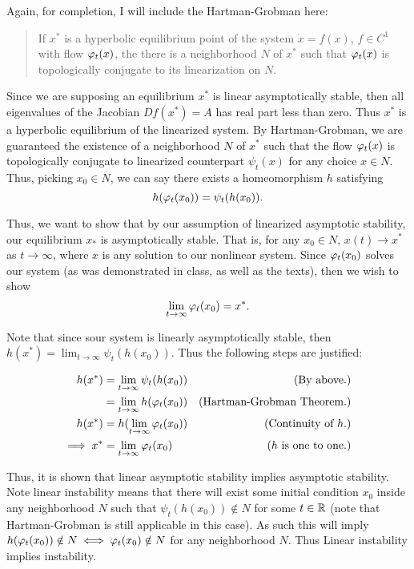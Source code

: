 \begin{solution}
    
    Again, for completion, I will include the Hartman-Grobman here:

    \alignbreak
    \vspace{-8mm}
    \begin{quote}
        If $x^*$ is a hyperbolic equilibrium point of the system $\dot{x} = f(x)$, $f \in C^1$ with flow $\varphi_t(x)$, the there is a neighborhood $N$ of $x^*$ such that $\varphi_t(x)$ is topologically conjugate to its linearization on $N$.
    \end{quote}
    \vspace{-8mm}
    \alignbreak

    Since we are supposing an equilibrium $x^*$ is linear asymptotically stable, then all eigenvalues of the Jacobian $Df(x^*) = A$ has real part less than zero. Thus $x^*$ is a hyperbolic equilibrium of the linearized system. By Hartman-Grobman, we are guaranteed the existence of a neighborhood $N$ of $x^*$ such that the flow $\varphi_t(x)$ is topologically conjugate to linearized counterpart $\psi_t(x)$ for any choice $x \in N$. Thus, picking $x_0 \in N$, we can say there exists a homeomorphism $h$ satisfying
    \[
    h(\varphi_t(x_0)) = \psi_t(h(x_0)).
    \]

    Thus, we want to show that by our assumption of linearized asymptotic stability, our equilibrium $x_*$ is asymptotically stable. That is, for any $x_0 \in N$, $x(t) \rightarrow x^*$ as $t \rightarrow \infty$, where $x$ is any solution to our nonlinear system. Since $\varphi_t(x_0)$ solves our system (as was demonstrated in class, as well as the texts), then we wish to show 
    \[
    \lim_{t \rightarrow \infty} \varphi_t(x_0) = x^*.
    \]
    
    Note that since sour system is linearly asymptotically stable, then $h(x^*) = \lim_{t\rightarrow \infty} \psi_t(h(x_0))$. Thus the following steps are justified:

    \alignbreak
    \begin{align}
        h(x^*) &= \lim_{t \rightarrow \infty} \psi_t(h(x_0)) &\text{(By above.)}\nonumber\\
        &= \lim_{t \rightarrow \infty} h(\varphi_t(x_0)) &\text{(Hartman-Grobman Theorem.)}\nonumber\\
        h(x^*) &= h(\lim_{t \rightarrow \infty} \varphi_t(x_0)) &\text{(Continuity of $h$.)}\nonumber\\
        \implies x^* &= \lim_{t \rightarrow \infty} \varphi_t(x_0) &\text{($h$ is one to one.)}\nonumber
    \end{align}
    \alignbreak

    \newpage
    Thus, it is shown that linear asymptotic stability implies asymptotic stability. Note linear instability means that there will exist some initial condition $x_0$ inside any neighborhood $N$ such that $\psi_t(h(x_0)) \notin N$ for some $t \in \mathbb{R}$ (note that Hartman-Grobman is still applicable in this case). As such this will imply $h(\varphi_t(x_0)) \notin N \iff \varphi_t(x_0) \notin N$ for any neighborhood $N$. Thus Linear instability implies instability.   
\end{solution}

